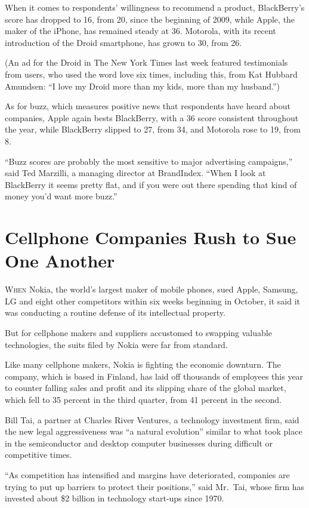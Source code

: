 ﻿\documentclass[12pt]{article}
\begin{document}
When it comes to respondents' willingness to recommend a product, BlackBerry's score has dropped to
16, from 20, since the beginning of 2009, while Apple, the maker of the iPhone, has remained steady
at 36. Motorola, with its recent introduction of the Droid smartphone, has grown to 30, from 26.

(An ad for the Droid in The New York Times last week featured testimonials from users, who used the
word love six times, including this, from Kat Hubbard Amundsen: ``I love my Droid more than my kids,
more than my husband.'')

As for buzz, which measures positive news that respondents have heard about companies, Apple again
bests BlackBerry, with a 36 score consistent throughout the year, while BlackBerry slipped to 27,
from 34, and Motorola rose to 19, from 8.

``Buzz scores are probably the most sensitive to major advertising campaigns,'' said Ted Marzilli, a
managing director at BrandIndex. ``When I look at BlackBerry it seems pretty flat, and if you were
out there spending that kind of money you'd want more buzz.''

\section{Cellphone Companies Rush to Sue One Another}

\lettrine{W}{hen} Nokia, the world's largest maker of mobile phones, sued
Apple, Samsung, LG and eight other competitors within six weeks beginning in October, it said it was
conducting a routine defense of its intellectual property.

But for cellphone makers and suppliers accustomed to swapping valuable technologies, the suits filed
by Nokia were far from standard.

Like many cellphone makers, Nokia is fighting the economic downturn. The company, which is based in
Finland, has laid off thousands of employees this year to counter falling sales and profit and its
slipping share of the global market, which fell to 35 percent in the third quarter, from 41 percent
in the second.

Bill Tai, a partner at Charles River Ventures, a technology investment firm, said the new legal
aggressiveness was ``a natural evolution'' similar to what took place in the semiconductor and
desktop computer businesses during difficult or competitive times.

``As competition has intensified and margins have deteriorated, companies are trying to put up
barriers to protect their positions,'' said Mr.~Tai, whose firm has invested about \$2 billion in
technology start-ups since 1970.
\end{document}
